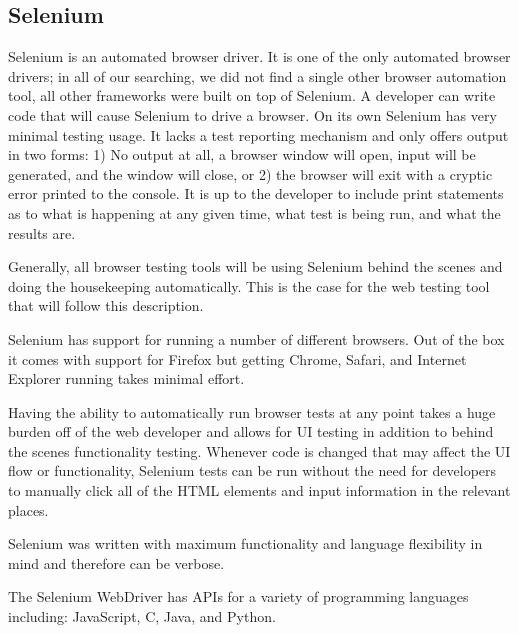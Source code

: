 \documentclass[12pt]{ucthesis}
\begin{document}
\subsection{Selenium}
Selenium \cite{Selenium} is an automated browser driver. It is one of the only automated browser drivers; in all of our searching, we did not find a single other browser automation tool, all other frameworks were built on top of Selenium. A developer can write code that will cause Selenium to drive a browser. On its own Selenium has very minimal testing usage. It lacks a test reporting mechanism and only offers output in two forms: 1) No output at all, a browser window will open, input will be generated, and the window will close, or 2) the browser will exit with a cryptic error printed to the console. It is up to the developer to include print statements as to what is happening at any given time, what test is being run, and what the results are.

Generally, all browser testing tools will be using Selenium behind the scenes and doing the housekeeping automatically. This is the case for the web testing tool that will follow this description.

Selenium has support for running a number of different browsers. Out of the box it comes with support for Firefox but getting Chrome, Safari, and Internet Explorer running takes minimal effort.

Having the ability to automatically run browser tests at any point takes a huge burden off of the web developer and allows for UI testing in addition to behind the scenes functionality testing. Whenever code is changed that may affect the UI flow or functionality, Selenium tests can be run without the need for developers to manually click all of the HTML elements and input information in the relevant places.


Selenium was written with maximum functionality and language flexibility in mind and therefore can be verbose.

The Selenium WebDriver has APIs for a variety of programming languages including: JavaScript, C, Java, and Python.
\end{document}
